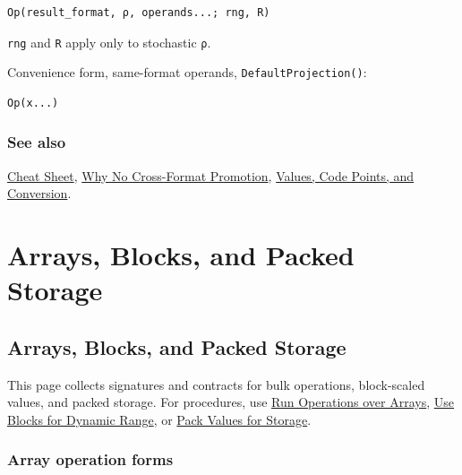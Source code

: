 \nopagebreak[4]
\begin{verbatim}
Op(result_format, ρ, operands...; rng, R)
\end{verbatim}



\texttt{rng} and \texttt{R} apply only to stochastic \texttt{ρ}.



Convenience form, same-format operands, \texttt{DefaultProjection()}:




\nopagebreak[4]
\begin{verbatim}
Op(x...)
\end{verbatim}



\subsection{See also}



\label{292862844209942199-dup12}{}


\href{help\_\allowbreak{}cheat\_\allowbreak{}sheet.md}{Cheat Sheet}, \href{concept\_\allowbreak{}julia\_\allowbreak{}numeric.md}{Why No Cross-Format Promotion}, \href{concept\_\allowbreak{}values\_\allowbreak{}codepoints.md}{Values, Code Points, and Conversion}.



\chapter{Arrays, Blocks, and Packed Storage}


\section{Arrays, Blocks, and Packed Storage}



\label{3098310143215484542}{}


This page collects signatures and contracts for bulk operations, block-scaled values, and packed storage. For procedures, use \href{workflow\_\allowbreak{}arrays.md}{Run Operations over Arrays}, \href{workflow\_\allowbreak{}blocks.md}{Use Blocks for Dynamic Range}, or \href{workflow\_\allowbreak{}packed\_\allowbreak{}storage.md}{Pack Values for Storage}.



\subsection{Array operation forms}



